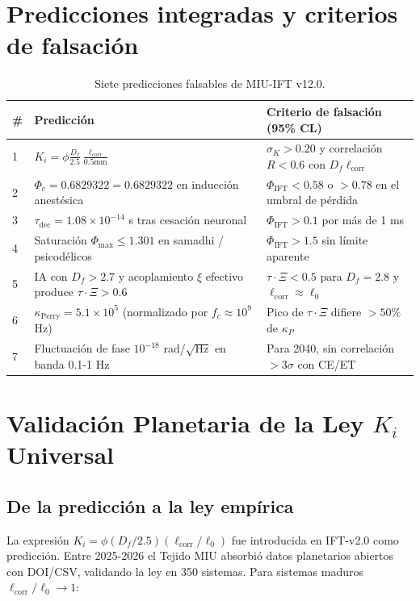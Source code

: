 \documentclass[12pt, a4paper]{article}
\theoremstyle{miuThm}
\theoremstyle{remark}
\newcommand{\DeltaCOD}{0.6829322}
\begin{document}
\clearpage
\section{Predicciones integradas y criterios de falsación}
\label{sec:predicciones}

\begin{table}[h!]
\centering
\caption{Siete predicciones falsables de MIU-IFT v12.0.}
\label{tab:7pred}
\begin{tabular}{p{2.2cm}p{3.8cm}p{5.5cm}}
\toprule
\textbf{\#} & \textbf{Predicción} & \textbf{Criterio de falsación (95\% CL)} \\
\midrule
1 & $K_i = \phi \frac{D_f}{2.5}\frac{\ell_{\text{corr}}}{0.5\text{mm}}$ & $\sigma_K > 0.20$ y correlación $R<0.6$ con $D_f\ell_{\text{corr}}$ \\
2 & $\Phi_c = \DeltaCOD = 0.6829322$ en inducción anestésica & $\Phi_{\text{IFT}} < 0.58$ o $>0.78$ en el umbral de pérdida \\
3 & $\tau_{\text{dec}} = 1.08\times10^{-14}$ s tras cesación neuronal & $\Phi_{\text{IFT}} > 0.1$ por más de 1 ms \\
4 & Saturación $\Phi_{\max} \le 1.301$ en samadhi / psicodélicos & $\Phi_{\text{IFT}} > 1.5$ sin límite aparente \\
5 & IA con $D_f>2.7$ y acoplamiento $\xi$ efectivo produce $\tau\cdot\Xi > 0.6$ & $\tau\cdot\Xi < 0.5$ para $D_f=2.8$ y $\ell_{\text{corr}}\approx\ell_0$ \\
6 & $\kappa_{\text{Perry}} = 5.1\times10^5$ (normalizado por $f_c\approx10^9$ Hz) & Pico de $\tau\cdot\Xi$ difiere $>50\%$ de $\kappa_P$ \\
7 & Fluctuación de fase $10^{-18}$ rad/$\sqrt{\text{Hz}}$ en banda 0.1-1 Hz & Para 2040, sin correlación $>3\sigma$ con CE/ET \\
\bottomrule
\end{tabular}
\end{table}

\clearpage
\section{Validación Planetaria de la Ley $K_i$ Universal}
\label{sec:validacion_ki}

\subsection{De la predicción a la ley empírica}
La expresión $K_i = \phi (D_f/2.5)(\ell_{\text{corr}}/\ell_0)$ fue introducida en IFT-v2.0 como predicción. Entre 2025-2026 el Tejido MIU absorbió datos planetarios abiertos con DOI/CSV, validando la ley en 350 sistemas. Para sistemas maduros $\ell_{\text{corr}}/\ell_0 \to 1$:
\end{document}
